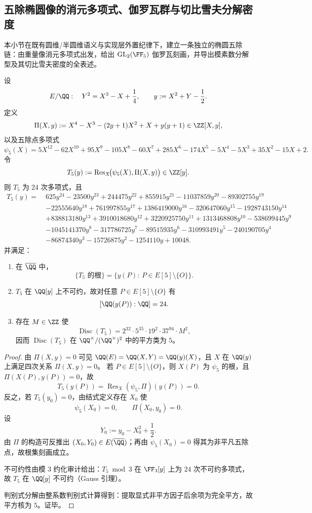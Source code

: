 \subsection{五除椭圆像的消元多项式、伽罗瓦群与切比雪夫分解密度}\label{subsec:conclusion-elliptic-five-division-chebotarev-density}
本小节在既有圆维/半圆维语义与实现层外置纪律下，建立一条独立的椭圆五除链：由重量像消元多项式出发，给出 \(\mathrm{GL}_2(\FF_5)\) 伽罗瓦刻画，并导出模素数分解型及其切比雪夫密度的全表述。

\begin{theorem}\label{thm:conclusion-elliptic-t5-elimination-discriminant-squareclass}
设
\[
E/\QQ:\quad Y^2=X^3-X+\frac14,
\qquad
y:=X^2+Y-\frac12.
\]
定义
\[
\Pi(X,y):=X^4-X^3-(2y+1)X^2+X+y(y+1)\in\ZZ[X,y],
\]
以及五除点多项式
\[
\psi_5(X)=5X^{12}-62X^{10}+95X^9-105X^8-60X^7+285X^6-174X^5-5X^4-5X^3+35X^2-15X+2.
\]
令
\[
T_5(y):=\operatorname{Res}_X\!\bigl(\psi_5(X),\Pi(X,y)\bigr)\in\ZZ[y].
\]
则 \(T_5\) 为 24 次多项式，且
\[
\begin{aligned}
T_5(y)=\;&625 y^{24}-23500 y^{23}+244475 y^{22}+855915 y^{21}-11037859 y^{20}-89302755 y^{19}\\
&-22555640 y^{18}+761997855 y^{17}+1386419000 y^{16}-320647060 y^{15}-1928743150 y^{14}\\
&+838813180 y^{13}+3910018680 y^{12}+3220925750 y^{11}+1313468808 y^{10}-538699445 y^9\\
&-1045141370 y^8-317786725 y^7-89515935 y^6-310993491 y^5-240190705 y^4\\
&-86874340 y^3-15726875 y^2-1254110 y+10048.
\end{aligned}
\]
并满足：
\begin{enumerate}
  \item 在 \(\overline{\QQ}\) 中，
  \[
  \{\text{\(T_5\) 的根}\}
  =
  \{y(P):\ P\in E[5]\setminus\{O\}\}.
  \]
  \item \(T_5\) 在 \(\QQ[y]\) 上不可约，故对任意 \(P\in E[5]\setminus\{O\}\) 有
  \[
  [\QQ(y(P)):\QQ]=24.
  \]
  \item 存在 \(M\in\ZZ\) 使
  \[
  \operatorname{Disc}(T_5)=2^{32}\cdot 5^{35}\cdot 19^2\cdot 37^{94}\cdot M^2,
  \]
  因而 \(\operatorname{Disc}(T_5)\) 在 \(\QQ^\times/(\QQ^\times)^2\) 中的平方类为 \(5\)。
\end{enumerate}
\end{theorem}
\begin{proof}
由 \(\Pi(X,y)=0\) 可见 \(\QQ(E)=\QQ(X,Y)=\QQ(y)(X)\)，且 \(X\) 在 \(\QQ(y)\) 上满足四次关系 \(\Pi(X,y)=0\)。
若 \(P\in E[5]\setminus\{O\}\)，则 \(X(P)\) 为 \(\psi_5\) 的根，且 \(\Pi(X(P),y(P))=0\)，故
\[
T_5(y(P))=\operatorname{Res}_X(\psi_5,\Pi)(y(P))=0.
\]
反之，若 \(T_5(y_0)=0\)，由结式定义存在 \(X_0\) 使
\[
\psi_5(X_0)=0,\qquad \Pi(X_0,y_0)=0.
\]
设
\[
Y_0:=y_0-X_0^2+\frac12.
\]
由 \(\Pi\) 的构造可反推出 \((X_0,Y_0)\in E(\overline{\QQ})\)；再由 \(\psi_5(X_0)=0\) 得其为非平凡五除点，故根集刻画成立。

不可约性由模 \(3\) 约化审计给出：\(T_5\bmod 3\) 在 \(\FF_3[y]\) 上为 24 次不可约多项式，故 \(T_5\) 在 \(\QQ[y]\) 不可约（Gauss 引理）。

判别式分解由整系数判别式计算得到：提取显式非平方因子后余项为完全平方，故平方核为 \(5\)。证毕。
\end{proof}

